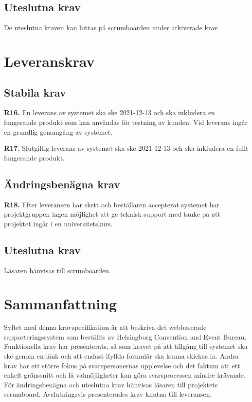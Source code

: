 \documentclass{article}
\begin{document}
    \vspace{1em}    
    \subsection{Uteslutna krav}
    De uteslutna kraven kan hittas på scrumboarden under arkiverade krav.
    \newpage
    \section{Leveranskrav}
    
    \subsection{Stabila krav}
\noindent \large{\textbf{R16.}}
     \normalsize{En leverans av systemet ska ske 2021-12-13 och ska inkludera en fungerande produkt som kan användas för testning av kunden. Vid leverans ingår en grundlig genomgång av systemet.
     }
     \vspace{1em}
     
\noindent \large{\textbf{R17.}}
    \normalsize{Slutgiltig leverans av systemet ska ske 2021-12-13 och ska inkludera en fullt fungerande produkt.}
     
     
    \subsection{Ändringsbenägna krav}
    
    \noindent \large{\textbf{R18.}}
    \normalsize{Efter leveransen har skett och beställaren accepterat systemet har projektgruppen ingen möjlighet att ge teknisk support med tanke på att projektet ingår i en universitetskurs.}
    
    \subsection{Uteslutna krav}
    Läsaren hänvisas till scrumboarden.
    

\section{Sammanfattning}
Syftet med denna kravspecifikation är att beskriva det webbaserade rapporteringssystem som beställts av Helsingborg Convention and Event Bureau. Funktionella krav har presenterats, så som kravet på att tillgång till systemet ska ske genom en länk och att endast ifyllda formulär ska kunna skickas in. Andra krav har ett större fokus på svarspersonernas upplevelse och det faktum att ett enkelt gränssnitt och få valmöjligheter kan göra svarsprocessen mindre krävande. För ändringsbenägna och uteslutna krav hänvisas läsaren till projektets scrumboard. Avslutningsvis presenterades krav knutna till leveransen. 
    
    
   

\end{document}
